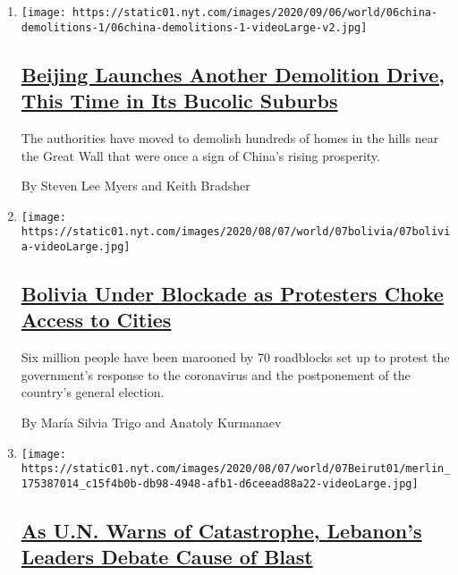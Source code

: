 \begin{enumerate}
\def\labelenumi{\arabic{enumi}.}
\item
  \texttt{[image: https://static01.nyt.com/images/2020/09/06/world/06china-demolitions-1/06china-demolitions-1-videoLarge-v2.jpg]}

  \hypertarget{beijing-launches-another-demolition-drive-this-time-in-its-bucolic-suburbs}{%
  \subsection{\texorpdfstring{\href{/2020/08/07/world/asia/china-beijing-crackdown-housing.html}{Beijing
  Launches Another Demolition Drive, This Time in Its Bucolic
  Suburbs}}{Beijing Launches Another Demolition Drive, This Time in Its Bucolic Suburbs}}\label{beijing-launches-another-demolition-drive-this-time-in-its-bucolic-suburbs}}

  The authorities have moved to demolish hundreds of homes in the hills
  near the Great Wall that were once a sign of China's rising
  prosperity.

  By Steven Lee Myers and Keith Bradsher
\item
  \texttt{[image: https://static01.nyt.com/images/2020/08/07/world/07bolivia/07bolivia-videoLarge.jpg]}

  \hypertarget{bolivia-under-blockade-as-protesters-choke-access-to-cities}{%
  \subsection{\texorpdfstring{\href{/2020/08/07/world/americas/bolivia-roadblock-blockade.html}{Bolivia
  Under Blockade as Protesters Choke Access to
  Cities}}{Bolivia Under Blockade as Protesters Choke Access to Cities}}\label{bolivia-under-blockade-as-protesters-choke-access-to-cities}}

  Six million people have been marooned by 70 roadblocks set up to
  protest the government's response to the coronavirus and the
  postponement of the country's general election.

  By María Silvia Trigo and Anatoly Kurmanaev
\item
  \texttt{[image: https://static01.nyt.com/images/2020/08/07/world/07Beirut01/merlin\_175387014\_c15f4b0b-db98-4948-afb1-d6ceead88a22-videoLarge.jpg]}

  \hypertarget{as-un-warns-of-catastrophe-lebanons-leaders-debate-cause-of-blast}{%
  \subsection{\texorpdfstring{\href{/2020/08/07/world/europe/lebanon-catastrophe-explosion-external-interference.html}{As
  U.N. Warns of Catastrophe, Lebanon's Leaders Debate Cause of
  Blast}}{As U.N. Warns of Catastrophe, Lebanon's Leaders Debate Cause of Blast}}\label{as-un-warns-of-catastrophe-lebanons-leaders-debate-cause-of-blast}}


\end{enumerate}
